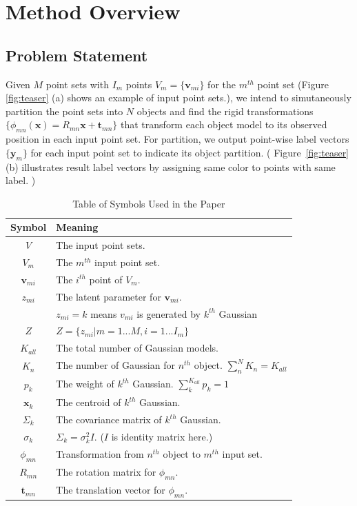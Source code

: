 \section{Method Overview}
\label{sec:method}
\subsection{Problem Statement}
Given $M$ point sets with $I_m$ points $V_m=\{\pmb{v}_{mi}\}$ for the $m^{th}$ point set (Figure \ref{fig:teaser} (a) shows an example of input point sets.), we intend to simutaneously partition the point sets into $N$ objects and find the rigid transformations $\{\phi_{mn}(\pmb{x})=R_{mn}\pmb{x}+\pmb{t}_{mn}\}$ that transform each object model to its observed position in each input point set.  For partition, we output point-wise label vectors $\{\pmb y_m\}$ for each input point set to indicate its object partition. ( Figure~\ref{fig:teaser} (b) illustrates result label vectors by assigning same color to points with same label. )
\begin{table}[!hbp]

\centering
\begin{tabular}{c l}
\hline
Symbol & Meaning\\
\hline
$V$ & The input point sets.\\
$V_m$ & The $m^{th}$ input point set.\\
$\pmb v_{mi}$ & The $i^{th}$ point of $V_m$.\\
$z_{mi}$ & The latent parameter for $\pmb v_{mi}$.\\
& $z_{mi}=k$ means $v_{mi}$ is generated by $k^{th}$ Gaussian\\
$Z$ & $Z=\{z_{mi}|m=1...M,i=1...I_m\}$\\
$K_{all}$ & The total number of Gaussian models.\\
$K_n$   & The number of Gaussian for $n^{th}$ object. $\sum_n^N K_n = K_{all}$\\
$p_k$  & The weight of $k^{th}$ Gaussian. $\sum_k^{K_{all}}p_k=1$\\
$\pmb x_k$ & The centroid of $k^{th}$ Gaussian.\\
$\Sigma_k$ & The covariance matrix of $k^{th}$ Gaussian.\\
$\sigma_k$ & $\Sigma_k=\sigma_k^2I$. ($I$ is identity matrix here.)\\
$\phi_{mn}$ & Transformation from $n^{th}$ object to $m^{th}$ input set.\\
$R_{mn}$ & The rotation matrix for $\phi_{mn}$.\\
$\pmb t_{mn}$ & The translation vector for $\phi_{mn}$.
\end{tabular}
\caption{Table of Symbols Used in the Paper}

\end{table}
